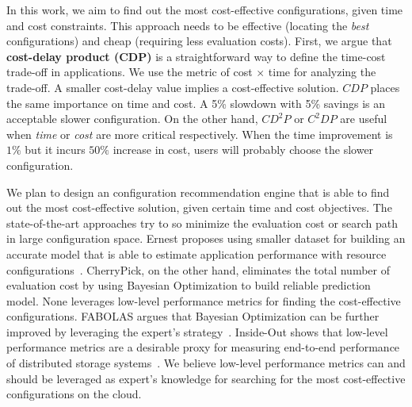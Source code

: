 In this work, we aim to find out the most cost-effective
configurations, given time and cost constraints.
This approach needs to be
effective (locating the \emph{best} configurations) and
cheap (requiring less evaluation costs).
First, we argue that \textbf{cost-delay product (CDP)} is a
straightforward way to define the time-cost trade-off in applications.
We use the metric of cost $\times$ time for analyzing the trade-off.
A smaller cost-delay value implies a cost-effective solution.
$CDP$ places the same importance on time and cost.
A 5\% slowdown with 5\% savings is an acceptable slower configuration.
On the other hand, $CD^2P$ or $C^2DP$ are useful
when \emph{time} or \emph{cost}
are more critical respectively.
When the time improvement is $1\%$ but it incurs $50\%$ increase in cost,
users will probably choose the slower configuration.

We plan to design an configuration recommendation engine
that is able to find out the most cost-effective solution,
given certain time and cost objectives.
The state-of-the-art approaches try to so minimize
the evaluation cost or search path in large configuration space.
Ernest proposes using smaller dataset for building an accurate model
that is able to estimate application performance
with resource configurations~\cite{Venkataraman2016}.
CherryPick, on the other hand, eliminates the total number of evaluation cost
by using Bayesian Optimization to build reliable prediction model.
None leverages low-level performance metrics
for finding the cost-effective configurations.
FABOLAS argues that Bayesian Optimization can be further improved by
leveraging the expert's strategy~\cite{Klein2016}.
Inside-Out shows that low-level performance metrics are a desirable proxy
for measuring end-to-end performance of
distributed storage systems~\cite{Hsu2016}.
We believe low-level performance metrics can and should be leveraged
as expert's knowledge for searching for
the most cost-effective configurations on the cloud.
